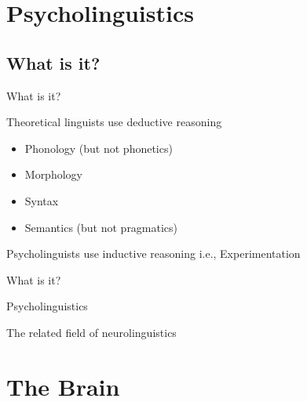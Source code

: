 \documentclass{beamer}
\subtitle[Psycholinguistics Intro]{Introduction to Psycholinguistics}
\newcommand{\suboneone}{What is it?}
\begin{document}
  

  \section{Psycholinguistics}
    \subsection{\suboneone}
      \begin{frame}{\suboneone}
        \begin{block}{Theoretical linguists use deductive reasoning}
          \begin{itemize}
            \item Phonology (but not phonetics)
            \item Morphology
            \item Syntax
            \item Semantics (but not pragmatics)
          \end{itemize}
        \end{block}
        \begin{block}{Psycholinguists use inductive reasoning}
          i.e., Experimentation
        \end{block}
      \end{frame}

      \begin{frame}{\suboneone}
        \begin{alertblock}{Psycholinguistics}
          
        \end{alertblock}
        \begin{block}{The related field of \alert{neurolinguistics}}
          
        \end{block}
      \end{frame}

  \section{The Brain}
\end{document}

